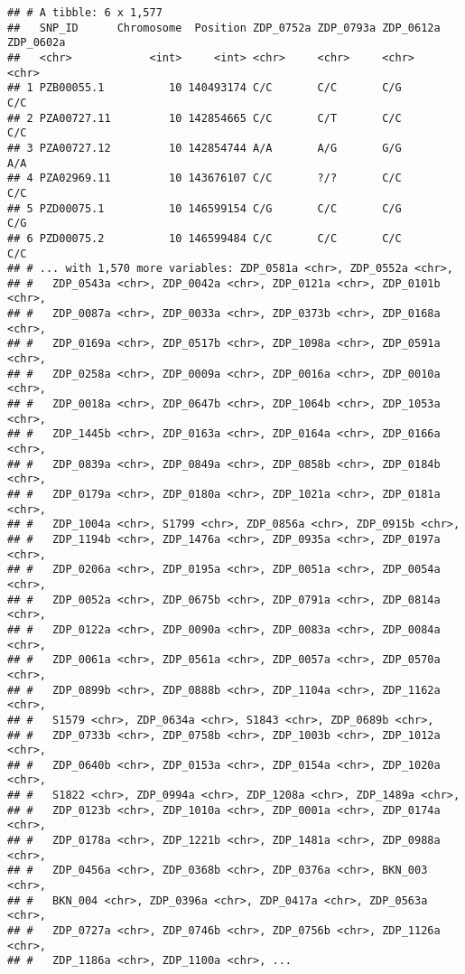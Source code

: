 \documentclass[]{article}
\begin{document}
\begin{verbatim}
## # A tibble: 6 x 1,577
##   SNP_ID      Chromosome  Position ZDP_0752a ZDP_0793a ZDP_0612a ZDP_0602a
##   <chr>            <int>     <int> <chr>     <chr>     <chr>     <chr>    
## 1 PZB00055.1          10 140493174 C/C       C/C       C/G       C/C      
## 2 PZA00727.11         10 142854665 C/C       C/T       C/C       C/C      
## 3 PZA00727.12         10 142854744 A/A       A/G       G/G       A/A      
## 4 PZA02969.11         10 143676107 C/C       ?/?       C/C       C/C      
## 5 PZD00075.1          10 146599154 C/G       C/C       C/G       C/G      
## 6 PZD00075.2          10 146599484 C/C       C/C       C/C       C/C      
## # ... with 1,570 more variables: ZDP_0581a <chr>, ZDP_0552a <chr>,
## #   ZDP_0543a <chr>, ZDP_0042a <chr>, ZDP_0121a <chr>, ZDP_0101b <chr>,
## #   ZDP_0087a <chr>, ZDP_0033a <chr>, ZDP_0373b <chr>, ZDP_0168a <chr>,
## #   ZDP_0169a <chr>, ZDP_0517b <chr>, ZDP_1098a <chr>, ZDP_0591a <chr>,
## #   ZDP_0258a <chr>, ZDP_0009a <chr>, ZDP_0016a <chr>, ZDP_0010a <chr>,
## #   ZDP_0018a <chr>, ZDP_0647b <chr>, ZDP_1064b <chr>, ZDP_1053a <chr>,
## #   ZDP_1445b <chr>, ZDP_0163a <chr>, ZDP_0164a <chr>, ZDP_0166a <chr>,
## #   ZDP_0839a <chr>, ZDP_0849a <chr>, ZDP_0858b <chr>, ZDP_0184b <chr>,
## #   ZDP_0179a <chr>, ZDP_0180a <chr>, ZDP_1021a <chr>, ZDP_0181a <chr>,
## #   ZDP_1004a <chr>, S1799 <chr>, ZDP_0856a <chr>, ZDP_0915b <chr>,
## #   ZDP_1194b <chr>, ZDP_1476a <chr>, ZDP_0935a <chr>, ZDP_0197a <chr>,
## #   ZDP_0206a <chr>, ZDP_0195a <chr>, ZDP_0051a <chr>, ZDP_0054a <chr>,
## #   ZDP_0052a <chr>, ZDP_0675b <chr>, ZDP_0791a <chr>, ZDP_0814a <chr>,
## #   ZDP_0122a <chr>, ZDP_0090a <chr>, ZDP_0083a <chr>, ZDP_0084a <chr>,
## #   ZDP_0061a <chr>, ZDP_0561a <chr>, ZDP_0057a <chr>, ZDP_0570a <chr>,
## #   ZDP_0899b <chr>, ZDP_0888b <chr>, ZDP_1104a <chr>, ZDP_1162a <chr>,
## #   S1579 <chr>, ZDP_0634a <chr>, S1843 <chr>, ZDP_0689b <chr>,
## #   ZDP_0733b <chr>, ZDP_0758b <chr>, ZDP_1003b <chr>, ZDP_1012a <chr>,
## #   ZDP_0640b <chr>, ZDP_0153a <chr>, ZDP_0154a <chr>, ZDP_1020a <chr>,
## #   S1822 <chr>, ZDP_0994a <chr>, ZDP_1208a <chr>, ZDP_1489a <chr>,
## #   ZDP_0123b <chr>, ZDP_1010a <chr>, ZDP_0001a <chr>, ZDP_0174a <chr>,
## #   ZDP_0178a <chr>, ZDP_1221b <chr>, ZDP_1481a <chr>, ZDP_0988a <chr>,
## #   ZDP_0456a <chr>, ZDP_0368b <chr>, ZDP_0376a <chr>, BKN_003 <chr>,
## #   BKN_004 <chr>, ZDP_0396a <chr>, ZDP_0417a <chr>, ZDP_0563a <chr>,
## #   ZDP_0727a <chr>, ZDP_0746b <chr>, ZDP_0756b <chr>, ZDP_1126a <chr>,
## #   ZDP_1186a <chr>, ZDP_1100a <chr>, ...
\end{verbatim}
\end{document}
